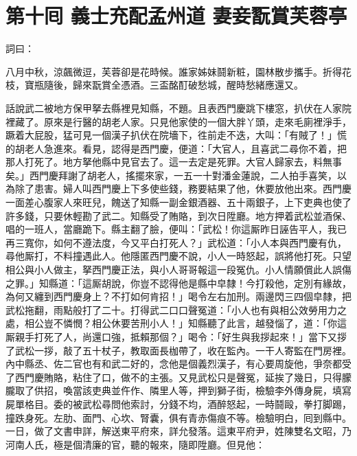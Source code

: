 
\chapter*{第十囘 義士充配孟州道 妻妾翫賞芙蓉亭}


詞曰：

\begin{myquote}
八月中秋，涼飆微逗，芙蓉卻是花時候。誰家姊妹鬪新粧，園林散步攜手。折得花枝，寶瓶隨後，歸來翫賞全憑酒。三盃酩酊破愁城，醒時愁緒應還又。

\end{myquote}

話說武二被地方保甲拏去縣裡見知縣，不題。且表西門慶跳下樓窓，扒伏在人家院裡藏了。原來是行醫的胡老人家。只見他家使的一個大胖丫頭，走來毛廁裡淨手，蹶着大屁股，猛可見一個漢子扒伏在院墻下，徃前走不迭，大叫：「有賊了！」{}慌的胡老人急進來。看見，認得是西門慶，便道：「大官人，且喜武二尋你不着，把那人打死了。地方拏他縣中見官去了。這一去定是死罪。大官人歸家去，料無事矣。」西門慶拜謝了胡老人，搖擺來家，一五一十對潘金蓮說，二人拍手喜笑，以為除了患害。{}婦人叫西門慶上下多使些錢，務要結果了他，休要放他出來。西門慶一面差心腹家人來旺兒，餽送了知縣一副金銀酒器、五十兩銀子，上下吏典也使了許多錢，只要休輕勘了武二。知縣受了賄賂，到次日陞廳。地方押着武松並酒保、唱的一班人，當廳跪下。縣主翻了臉，便叫：「武松！你這厮昨日誣告平人，我已再三寬你，如何不遵法度，今又平白打死人？」武松道：「小人本與西門慶有仇，尋他厮打，不料撞遇此人。他隱匿西門慶不說，小人一時怒起，誤將他打死。只望相公與小人做主，拏西門慶正法，與小人哥哥報這一段冤仇。小人情願償此人誤傷之罪。」知縣道：「這厮胡說，你豈不認得他是縣中皁隸！今打殺他，定別有緣故，為何又纏到西門慶身上？不打如何肯招！」喝令左右加刑。兩邊閃三四個皁隸，把武松拖翻，雨點般打了二十。打得武二口口聲冤道：「小人也有與相公效勞用力之處，相公豈不憐憫？相公休要苦刑小人！」知縣聽了此言，越發惱了，道：「你這厮親手打死了人，尚還口強，抵賴那個？」喝令：「好生與我拶起來！」當下又拶了武松一拶，敲了五十杖子，教取面長枷帶了，收在監內。一干人寄監在門房裡。內中縣丞、佐二官也有和武二好的，念他是個義烈漢子，有心要周旋他，爭奈都受了西門慶賄賂，粘住了口，做不的主張。又見武松只是聲冤，延挨了幾日，只得朦朧取了供招，喚當該吏典並仵作、隣里人等，押到獅子街，檢驗李外傳身屍，填寫屍單格目。委的被武松尋問他索討，分錢不均，酒醉怒起，一時鬪毆，拳打脚踢，撞跌身死。左肋、面門、心坎、腎囊，俱有青赤傷痕不等。檢驗明白，囘到縣中。一日，做了文書申詳，解送東平府來，詳允發落。這東平府尹，姓陳雙名文昭，乃河南人氏，極是個清廉的官，聽的報來，隨即陞廳。但見他：

